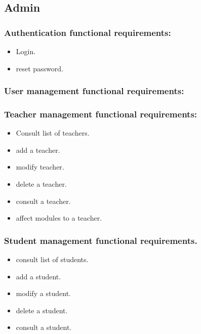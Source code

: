 \documentclass[]{uc2pfecaneva}
\begin{document}
    \subsection{Admin}
    \begin{itemize}
        \subsubsection{Authentication functional requirements:}
        \begin{itemize}
            \item Login.
            \item reset password.
        \end{itemize}

        \subsubsection{User management functional requirements:}
        \begin{itemize}

            \subsubsection{Teacher management functional requirements:}
            \begin{itemize}
                \item Consult list of teachers.
                \item add a teacher.
                \item modify teacher.
                \item delete a teacher.
                \item consult a teacher.
                \item affect modules to a teacher.
            \end{itemize}

            \subsubsection{Student management functional requirements.}
            \begin{itemize}
                \item consult list of students.
                \item add a student.
                \item modify a student.
                \item delete a student.
                \item consult a student.
            \end{itemize}


\end{itemize}
\end{itemize}
\end{document}
